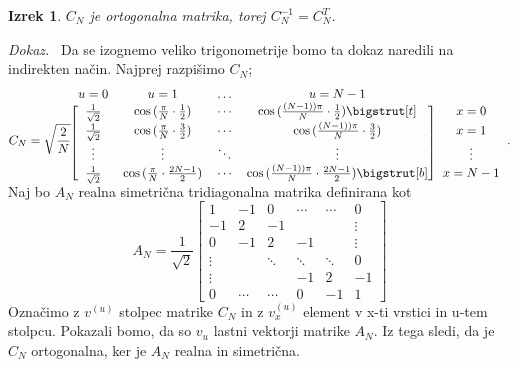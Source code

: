 \documentclass[a4paper,12pt,openright]{book}
\newtheorem{izrek}{Izrek}[chapter]
\newenvironment{dokaz}{\emph{Dokaz.}\ }{\hspace{\fill}{$\Box$}}
\begin{document}
\begin{izrek}
\label{iz:dokaz_ortogonalnosti}
$C_N$ je ortogonalna matrika, torej $C_N^{-1} = C_N^T$.
\end{izrek}
\begin{dokaz}
Da se izognemo veliko trigonometrije bomo ta dokaz naredili na indirekten način.
Najprej razpišimo $C_N$;
\begin{gather}
  C_N = \sqrt{\frac{2}{N}}
  \begin{blockarray}{ccccc}
     u=0               & u= 1                                 &\dots  & u=N-1                                                  &         \\
    \begin{block}{[cccc]c}
    \frac{1}{\sqrt{2}} & \cos{(\frac{\pi}{N}\cdot \frac{1}{2})}   &\cdots & \cos{(\frac{(N-1))\pi}{N}\cdot \frac{1}{2})}\bigstrut[t]   & x=0     \\
    \frac{1}{\sqrt{2}} & \cos{(\frac{\pi}{N}\cdot \frac{3}{2})}   &\cdots & \cos{(\frac{(N-1))\pi}{N}\cdot \frac{3}{2})}               & x=1     \\
    \vdots             &\vdots                                &\ddots & \vdots                                                 &\vdots   \\
    \frac{1}{\sqrt{2}} & \cos{(\frac{\pi}{N}\cdot \frac{2N-1}{2})}&\cdots & \cos{(\frac{(N-1))\pi}{N}\cdot \frac{2N-1}{2})}\bigstrut[b]& x=N-1     \\
    \end{block}
  \end{blockarray}\vspace*{-1.25\baselineskip}.
\end{gather}
Naj bo $A_N$ realna simetrična tridiagonalna matrika definirana kot
\[
  A_N =  \frac{1}{\sqrt{2}}
  \begin{bmatrix}
    1      & -1     & 0      & \cdots & \cdots & 0      \\
    -1     & 2      & -1     &        &        & \vdots \\
    0      & -1     & 2      & -1     &        & \vdots \\
    \vdots &        & \ddots & \ddots & \ddots & 0      \\
    \vdots &        &        &  -1    & 2      & -1     \\
    0      & \cdots & \cdots &  0     & -1     & 1       
  \end{bmatrix}
\]
Označimo z $v^{(u)}$ stolpec matrike $C_N$ in z $v_x^{(u)}$ element v x-ti vrstici in u-tem stolpcu. Pokazali bomo, da so $v_u$ lastni vektorji matrike $A_N$. Iz tega sledi, da je $C_N$ ortogonalna, ker je $A_N$ realna in simetrična.

\end{dokaz}
\end{document}
